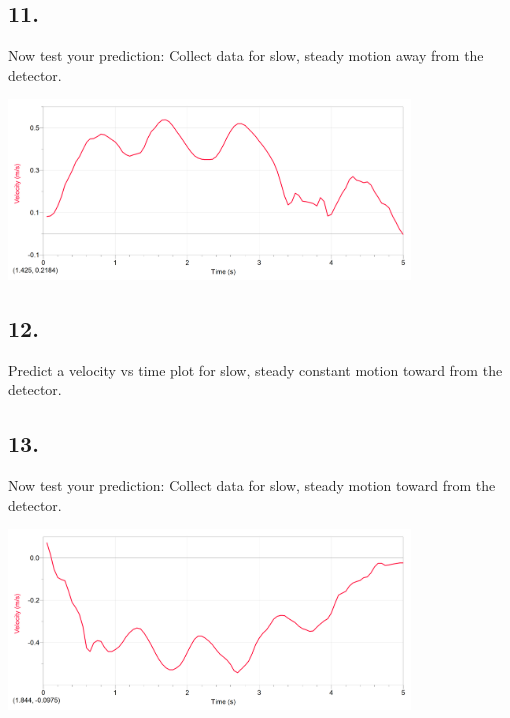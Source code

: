     \begin{mdframed}
        
    \end{mdframed}

    \subsection*{11.}
    Now test your prediction: Collect data for slow, steady motion away from the detector.

    \begin{mdframed}
        \centering\includegraphics[width=0.8\textwidth]{image5.png}
    \end{mdframed}

    \subsection*{12.}
    Predict a velocity vs time plot for slow, steady constant motion toward from the detector. 

    \begin{mdframed}
        
    \end{mdframed}

    \subsection*{13.}
    Now test your prediction: Collect data for slow, steady motion toward from the detector.

    \begin{mdframed}
        \centering\includegraphics[width=0.8\textwidth]{image6.png}
    \end{mdframed}


